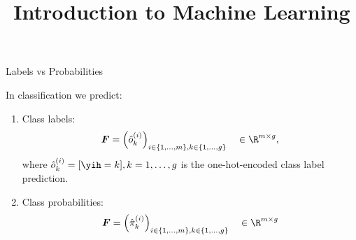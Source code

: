 \documentclass[11pt,compress,t,notes=noshow, xcolor=table]{beamer}
\title{Introduction to Machine Learning}
\institute{\href{https://compstat-lmu.github.io/lecture_i2ml/}{compstat-lmu.github.io/lecture\_i2ml}}
\date{}
\begin{document}







\begin{vbframe}{Labels vs Probabilities}

\footnotesize

In classification we predict:

\begin{enumerate}
  \item Class labels: \\
  $$\bm{F} = \left( \hat{o}_k^{(i)} \right)_{i \in \{1, \dots, m\}, 
  k \in \{1, \dots, g\}}
  \quad \in \R^{m \times g},$$
  where $\hat{o}_k^{(i)} = [\yih = k], k = 1, \dots, g$ is the one-hot-encoded 
  class label prediction.
  \item Class probabilities: \\
  $$\bm{F} = \left(\hat{\pi}_k^{(i)} \right)_{i \in \{1, \dots, m\}, 
  k \in \{1, \dots, g\}}
  \quad \in \R^{m \times g}$$
\end{enumerate}


\end{vbframe}
\end{document}
